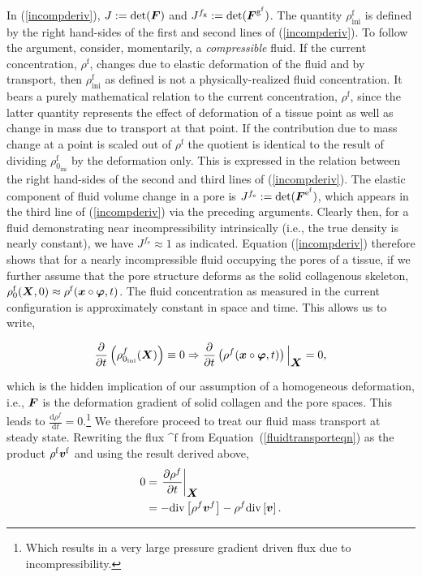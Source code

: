 In (\ref{incompderiv}), $J := \mathrm{det}(\mbox{\boldmath$ F$})$ and $J^{f_\mathrm{g}} :=
\mathrm{det}(\mbox{\boldmath$ F$}^{\mathrm{g}^{\mathrm{f}}})$. The quantity
$\rho_{\mathrm{ini}}^{\mathrm{f}}$ is defined by the right hand-sides
of the first and second lines of (\ref{incompderiv}). To follow the
argument, consider, momentarily, a \emph{compressible} fluid. If the
current concentration, $\rho^\mathrm{f}$, changes due to elastic
deformation of the fluid and by transport, then
$\rho_{\mathrm{ini}}^{\mathrm{f}}$ as defined is not a
physically-realized fluid concentration. It bears a purely
mathematical relation to the current concentration, $\rho^\mathrm{f}$,
since the latter quantity represents the effect of deformation of a
tissue point as well as change in mass due to transport at that
point. If the contribution due to mass change at a point is scaled
out of $\rho^\mathrm{f}$ the quotient is identical to the result of
dividing $\rho_{0_{\mathrm{ini}}}^{\mathrm{f}}$ by the deformation
only. This is expressed in the relation between the right hand-sides
of the second and third lines of (\ref{incompderiv}). The elastic
component of fluid volume change in a pore is $J^{f_\mathrm{e}} :=
\mathrm{det}(\mbox{\boldmath$ F$}^{\mathrm{e}^{\mathrm{f}}})$, which appears  in the third
line of (\ref{incompderiv}) via the preceding arguments. Clearly then,
for a fluid demonstrating near incompressibility intrinsically (i.e.,
the true density is nearly constant), we have $J^{f_\mathrm{e}}
\approx 1$ as indicated. Equation (\ref{incompderiv}) therefore shows
that for a nearly incompressible fluid occupying the pores of a
tissue, if we further assume that the pore structure deforms as the
solid collagenous skeleton, $\rho_0^\mathrm{f}(\mbox{\boldmath$ X$},0) \approx
\rho^\mathrm{f}(\mbox{\boldmath$ x$}\circ\mbox{\boldmath$\varphi$},t)$. The fluid concentration as
measured in the current configuration is approximately constant in
space and time. This allows us to write,


\begin{equation}
\frac{\partial} {\partial t}\left(
\rho_{0_{\mathrm{ini}}}^{f}(\mbox{\boldmath$ X$}) \right) \equiv 0 \Rightarrow
\frac{\partial} {\partial t}\left(\rho^{f} (\mbox{\boldmath$ x$}\circ\mbox{\boldmath$\varphi$},t)
\right)\Big\vert_{\mbox{\boldmath$ X$}} = 0,
\end{equation}

\noindent which is the hidden implication of our assumption of a
homogeneous deformation, i.e., $\mbox{\boldmath$ F$}$ is the deformation gradient of
solid collagen and the pore spaces.  This leads to $\frac{\mathrm{d}
  \rho^f} {\mathrm{d} 
  t}=0$.\footnote{Which results in a very large pressure gradient
  driven flux due to incompressibility. } We
therefore proceed to treat our fluid mass transport at steady
state. Rewriting the flux $\bm^{\mathrm{f}}$ from \mbox{Equation
(\ref{fluidtransporteqn})} as the product $\rho^{\mathrm{f}}
\mbox{\boldmath$ v$}^{\mathrm{f}}$ and using the result derived above,
\begin{equation}
\begin{split}
0 &= \left. \frac{\partial \rho^f}{\partial t} \right|_{\mbox{\boldmath$ X$}}\\ &=
-\mathrm{div}\left[\rho^f \mbox{\boldmath$ v$}^{f}\right] - \rho^f
\mathrm{div}\left[\mbox{\boldmath$ v$}\right].
\end{split}
\label{incomprimpl}
\end{equation}

